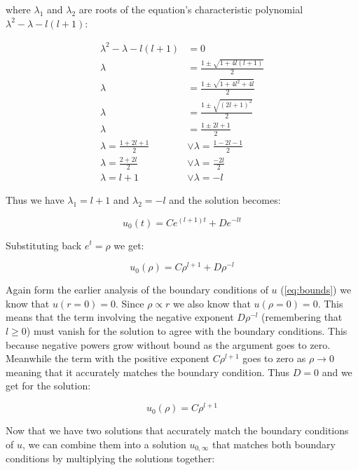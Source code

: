 \documentclass{article}
\begin{document}
    where $\lambda_1$ and $\lambda_2$ are roots of the equation's characteristic polynomial $\lambda^2 - \lambda - l(l + 1)$:

    \begin{align}
        \lambda^2 - \lambda - l(l + 1) &= 0 \\
        \lambda &= \frac{1 \pm \sqrt{ 1 + 4l(l + 1)}}{2} \\
        \lambda &= \frac{1 \pm \sqrt{ 1 + 4l^2 + 4l}}{2} \\
        \lambda &= \frac{1 \pm \sqrt{(2l + 1)^2}}{2} \\
        \lambda &= \frac{1 \pm 2l + 1}{2} \\
        \lambda = \frac{1 + 2l + 1}{2} &\lor \lambda = \frac{1 - 2l - 1}{2} \\
        \lambda = \frac{2 + 2l}{2} &\lor \lambda = \frac{-2l}{2} \\
        \lambda = l + 1 &\lor \lambda = -l
    \end{align}

    Thus we have $\lambda_1 = l + 1$ and $\lambda_2 = -l$ and the solution becomes:

    \begin{equation}
        u_{0}(t) = Ce^{(l+1)t} + De^{-lt}
    \end{equation}

    Substituting back $e^{t} = \rho$ we get:

    \begin{equation}
        u_{0}(\rho) = C\rho^{l + 1} + D\rho^{-l}
    \end{equation}

    Again form the earlier analysis of the boundary conditions of $u$ (\ref{eq:bounds}) we know that $u(r=0) = 0$. Since $\rho \propto r$ we also know that $u(\rho=0) = 0$. This means that
    the term involving the negative exponent $D\rho^{-l}$ (remembering that $l \geq 0$) must vanish for the solution to agree with the boundary conditions. This because negative powers grow
    without bound as the argument goes to zero. Meanwhile the term with the positive exponent $C\rho^{l + 1}$ goes to zero as $\rho \to 0$ meaning that it accurately matches the boundary condition.
    Thus $D = 0$ and we get for the solution:

    \begin{equation}
        u_{0}(\rho) = C\rho^{l + 1}
    \end{equation}

    Now that we have two solutions that accurately match the boundary conditions of $u$, we can combine them into a solution $u_{0,\infty}$ that matches both boundary conditions by multiplying
    the solutions together:
\end{document}

